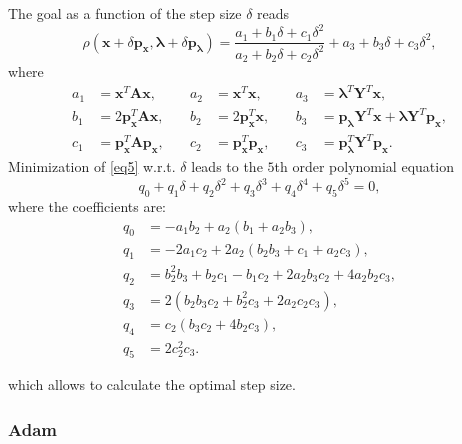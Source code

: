 The goal as a function of the step size $\delta$ reads
\begin{equation}
	\rho\left(\mathbf{x}+\delta \mathbf{p}_{\mathbf{x}},\bm{\lambda}+\delta \mathbf{p}_{\bm{\lambda}}\right) = \frac{a_1+b_1\delta+c_1\delta^2}{a_2+b_2\delta+c_2\delta^2} + a_3+b_3\delta + c_3 \delta^2,
	\label{eq5}
\end{equation}
where
\begin{align*}
	a_1 &= \mathbf{x}^T\mathbf{A}\mathbf{x}, & \quad a_2 &= \mathbf{x}^T\mathbf{x}, & \quad a_3 &= \bm{\lambda}^T\mathbf{Y}^T\mathbf{x}, \\
	b_1 &= 2 \mathbf{p}_{\mathbf{x}}^T\mathbf{A}\mathbf{x}, & \quad b_2 &= 2\mathbf{p}_{\mathbf{x}}^T\mathbf{x}, & \quad b_3 &=  \mathbf{p}_{\bm{\lambda}} \mathbf{Y}^T \mathbf{x} + \bm{\lambda}\mathbf{Y}^T\mathbf{p}_{\mathbf{x}}, \\
	c_1 &= \mathbf{p}_{\mathbf{x}}^T \mathbf{A} \mathbf{p}_{\mathbf{x}}, & \quad c_2 &= \mathbf{p}_{\mathbf{x}}^T\mathbf{p}_{\mathbf{x}}, &  \quad c_3 &= \mathbf{p}_{\bm{\lambda}}^T\mathbf{Y}^T\mathbf{p}_{\mathbf{x}}.
\end{align*}
Minimization of \ref{eq5} w.r.t. $\delta$ leads to the $5$th order polynomial equation
\begin{equation}
	q_0 + q_1 \delta + q_2 \delta^2 + q_3 \delta^3 + q_4 \delta^4 +q_5 \delta^5 = 0,
\end{equation}
where the coefficients are:
\begin{align*}
	q_0 &= -a_1 b_2 + a_2 (b_1 + a_2 b_3),\\
	q_1 &= -2 a_1 c_2 + 2 a_2 (b_2 b_3 + c_1 + a_2 c_3),\\ 
	q_2 &= b_2^2 b_3 + b_2 c_1 - b_1 c_2 + 2 a_2 b_3 c_2 + 4 a_2 b_2 c_3, \\
	q_3 &= 2 (b_2 b_3 c_2 + b_2^2 c_3 + 2 a_2 c_2 c_3),\\
	q_4 &= c_2 (b_3 c_2 + 4 b_2 c_3),\\
	q_5 &= 2 c_2^2 c_3.
\end{align*}

which allows to calculate the optimal step size.

\subsubsection{Adam}

\cite{kingma_adam:_2017}

